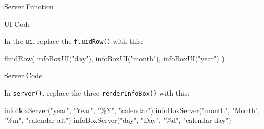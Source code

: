 \documentclass[
  oneside]{book}
\newenvironment{Shaded}{\begin{snugshade}}{\end{snugshade}}
\newcommand{\AttributeTok}[1]{\textcolor[rgb]{0.77,0.63,0.00}{#1}}
\newcommand{\ControlFlowTok}[1]{\textcolor[rgb]{0.13,0.29,0.53}{\textbf{#1}}}
\newcommand{\FunctionTok}[1]{\textcolor[rgb]{0.00,0.00,0.00}{#1}}
\newcommand{\NormalTok}[1]{#1}
\newcommand{\OtherTok}[1]{\textcolor[rgb]{0.56,0.35,0.01}{#1}}
\newcommand{\SpecialCharTok}[1]{\textcolor[rgb]{0.00,0.00,0.00}{#1}}
\newcommand{\StringTok}[1]{\textcolor[rgb]{0.31,0.60,0.02}{#1}}
\begin{document}
Server Function

\begin{Shaded}
\end{Shaded}

UI Code

In the \texttt{ui}, replace the \texttt{fluidRow}\texttt{()} with this:

\begin{Shaded}
\begin{Highlighting}[]
\FunctionTok{fluidRow}\NormalTok{(}
    \FunctionTok{infoBoxUI}\NormalTok{(}\StringTok{"day"}\NormalTok{),}
    \FunctionTok{infoBoxUI}\NormalTok{(}\StringTok{"month"}\NormalTok{),}
    \FunctionTok{infoBoxUI}\NormalTok{(}\StringTok{"year"}\NormalTok{)}
\NormalTok{)}
\end{Highlighting}
\end{Shaded}

Server Code

In \texttt{server}\texttt{()}, replace the three \texttt{renderInfoBox}\texttt{()} with this:

\begin{Shaded}
\begin{Highlighting}[]
\FunctionTok{infoBoxServer}\NormalTok{(}\StringTok{"year"}\NormalTok{, }\StringTok{"Year"}\NormalTok{, }\StringTok{"\%Y"}\NormalTok{, }\StringTok{"calendar"}\NormalTok{)}
\FunctionTok{infoBoxServer}\NormalTok{(}\StringTok{"month"}\NormalTok{, }\StringTok{"Month"}\NormalTok{, }\StringTok{"\%m"}\NormalTok{, }\StringTok{"calendar{-}alt"}\NormalTok{)}
\FunctionTok{infoBoxServer}\NormalTok{(}\StringTok{"day"}\NormalTok{, }\StringTok{"Day"}\NormalTok{, }\StringTok{"\%d"}\NormalTok{, }\StringTok{"calendar{-}day"}\NormalTok{)}
\end{Highlighting}
\end{Shaded}
\end{document}
